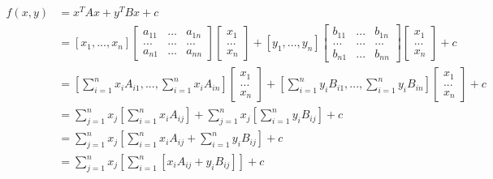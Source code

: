 \section{}

\subsection{}
\begin{align*}
    f(x, y) &= x^T A x + y^T B x + c \\
	&= 
	[x_1, ..., x_n] 
	\begin{bmatrix} 
	    a_{11} & ... & a_{1n} \\
	    ... & ... & ... \\
	    a_{n1} & ... & a_{nn}
	\end{bmatrix}
	\begin{bmatrix}
	    x_1 \\
	    ... \\
	    x_n
	\end{bmatrix}
	+
	[y_1, ..., y_n] 
	\begin{bmatrix} 
	    b_{11} & ... & b_{1n} \\
	    ... & ... & ... \\
	    b_{n1} & ... & b_{nn}
	\end{bmatrix}
	\begin{bmatrix}
	    x_1 \\
	    ... \\
	    x_n
	\end{bmatrix}
	+
	c \\
	&= 
	[\sum_{i=1}^n x_i A_{i1}, ..., \sum_{i=1}^n x_i A_{in}] 
	\begin{bmatrix}
	    x_1 \\
	    ... \\
	    x_n
	\end{bmatrix}
	+
	[\sum_{i=1}^n y_i B_{i1}, ..., \sum_{i=1}^n y_i B_{in}] 
	\begin{bmatrix}
	    x_1 \\
	    ... \\
	    x_n
	\end{bmatrix}
	+
	c \\
	&= \sum_{j=1}^n x_j [\sum_{i=1}^n x_i A_{ij}] + \sum_{j=1}^n x_j [\sum_{i=1}^n y_i B_{ij}] + c \\
	&= \sum_{j=1}^n x_j [\sum_{i=1}^n x_i A_{ij} + \sum_{i=1}^n y_i B_{ij}] + c \\
	&= \sum_{j=1}^n x_j [\sum_{i=1}^n [x_i A_{ij} + y_i B_{ij}]] + c \\
\end{align*}

